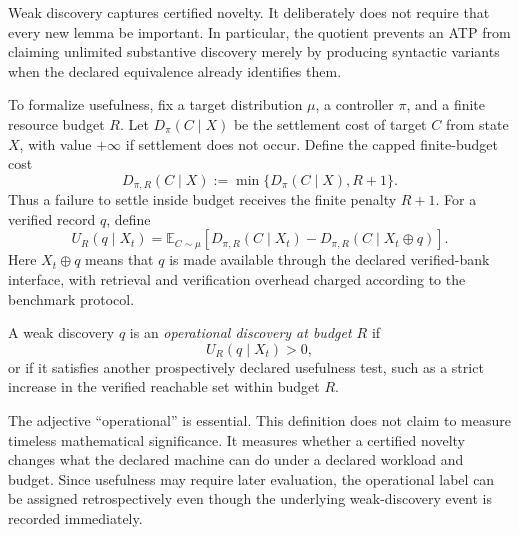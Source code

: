 Weak discovery captures certified novelty. It deliberately does not require that every new lemma be important. In particular, the quotient prevents an ATP from claiming unlimited substantive discovery merely by producing syntactic variants when the declared equivalence already identifies them.

To formalize usefulness, fix a target distribution $\mu$, a controller $\pi$, and a finite resource budget $R$. Let $D_{\pi}(C\mid X)$ be the settlement cost of target $C$ from state $X$, with value $+\infty$ if settlement does not occur. Define the capped finite-budget cost
\[
D_{\pi,R}(C\mid X):=\min\{D_{\pi}(C\mid X),R+1\}.
\]
Thus a failure to settle inside budget receives the finite penalty $R+1$. For a verified record $q$, define
\[
U_R(q\mid X_t)
=
\mathbb E_{C\sim\mu}
\left[
D_{\pi,R}(C\mid X_t)-D_{\pi,R}(C\mid X_t\oplus q)
\right].
\]
Here $X_t\oplus q$ means that $q$ is made available through the declared verified-bank interface, with retrieval and verification overhead charged according to the benchmark protocol.

\begin{definition}
A weak discovery $q$ is an \emph{operational discovery at budget $R$} if
\[
U_R(q\mid X_t)>0,
\]
or if it satisfies another prospectively declared usefulness test, such as a strict increase in the verified reachable set within budget $R$.
\end{definition}

The adjective ``operational'' is essential. This definition does not claim to measure timeless mathematical significance. It measures whether a certified novelty changes what the declared machine can do under a declared workload and budget. Since usefulness may require later evaluation, the operational label can be assigned retrospectively even though the underlying weak-discovery event is recorded immediately.

